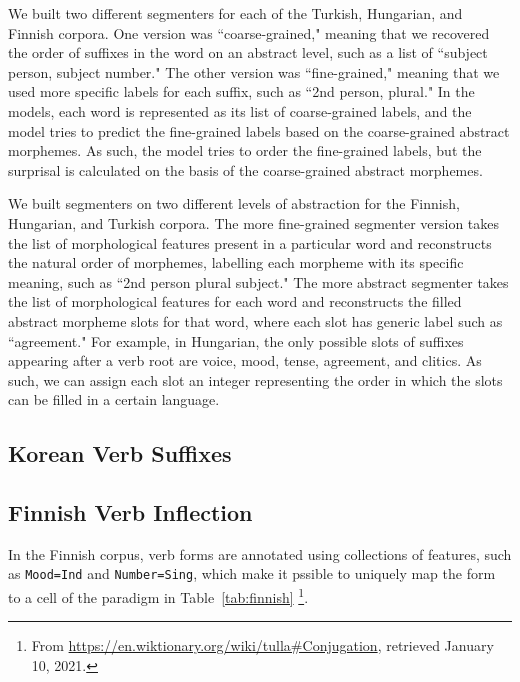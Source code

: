\documentclass[11pt,letterpaper]{article}
\begin{document}
We built two different segmenters for each of the Turkish, Hungarian, and Finnish corpora. One version was ``coarse-grained," meaning that we recovered the order of suffixes in the word on an abstract level, such as a list of ``subject person, subject number." The other version was ``fine-grained," meaning that we used more specific labels for each suffix, such as ``2nd person, plural." In the models, each word is represented as its list of coarse-grained labels, and the model tries to predict the fine-grained labels based on the coarse-grained abstract morphemes. As such, the model tries to order the fine-grained labels, but the surprisal is calculated on the basis of the coarse-grained abstract morphemes.
    
We built segmenters on two different levels of abstraction for the Finnish, Hungarian, and Turkish corpora. The more fine-grained segmenter version takes the list of morphological features present in a particular word and reconstructs the natural order of morphemes, labelling each morpheme with its specific meaning, such as ``2nd person plural subject." The more abstract segmenter takes the list of morphological features for each word and reconstructs the filled abstract morpheme slots for that word, where each slot has generic label such as ``agreement." For example, in Hungarian, the only possible slots of suffixes appearing after a verb root are voice, mood, tense, agreement, and clitics. As such, we can assign each slot an integer representing the order in which the slots can be filled in a certain language. 

\subsection{Korean Verb Suffixes}



\subsection{Finnish Verb Inflection}

In the Finnish corpus, verb forms are annotated using collections of features, such as \texttt{Mood=Ind} and \texttt{Number=Sing}, which make it pssible to uniquely map the form to a cell of the paradigm in Table~\ref{tab:finnish} \footnote{From \url{https://en.wiktionary.org/wiki/tulla\#Conjugation}, retrieved January 10, 2021.}.
\end{document}
